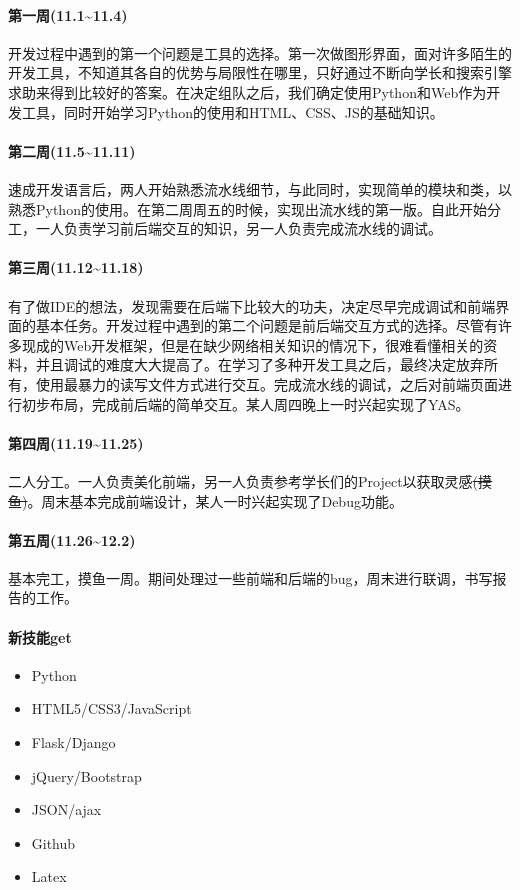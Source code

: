 \documentclass[a4paper,11pt,UTF8]{ctexart}
\begin{document}
\begin{sloppypar}
\paragraph{第一周(11.1\~{}11.4)}

开发过程中遇到的第一个问题是工具的选择。第一次做图形界面，面对许多陌生的开发工具，不知道其各自的优势与局限性在哪里，只好通过不断向学长和搜索引擎求助来得到比较好的答案。在决定组队之后，我们确定使用Python和Web作为开发工具，同时开始学习Python的使用和HTML、CSS、JS的基础知识。

\paragraph{第二周(11.5\~{}11.11)}

速成开发语言后，两人开始熟悉流水线细节，与此同时，实现简单的模块和类，以熟悉Python的使用。在第二周周五的时候，实现出流水线的第一版。自此开始分工，一人负责学习前后端交互的知识，另一人负责完成流水线的调试。

\paragraph{第三周(11.12\~{}11.18)}

有了做IDE的想法，发现需要在后端下比较大的功夫，决定尽早完成调试和前端界面的基本任务。开发过程中遇到的第二个问题是前后端交互方式的选择。尽管有许多现成的Web开发框架，但是在缺少网络相关知识的情况下，很难看懂相关的资料，并且调试的难度大大提高了。在学习了多种开发工具之后，最终决定放弃所有，使用最暴力的读写文件方式进行交互。完成流水线的调试，之后对前端页面进行初步布局，完成前后端的简单交互。某人周四晚上一时兴起实现了YAS。

\paragraph{第四周(11.19\~{}11.25)}

二人分工。一人负责美化前端，另一人负责参考学长们的Project以获取灵感\sout{(摸鱼)}。周末基本完成前端设计，某人一时兴起实现了Debug功能。

\paragraph{第五周(11.26\~{}12.2)}

基本完工，摸鱼一周。期间处理过一些前端和后端的bug，周末进行联调，书写报告的工作。

\paragraph{新技能get}
\begin{itemize}
\item Python
\item HTML5/CSS3/JavaScript
\item Flask/Django
\item jQuery/Bootstrap
\item JSON/ajax
\item Github
\item Latex
\end{itemize}


\end{sloppypar}
\end{document}
